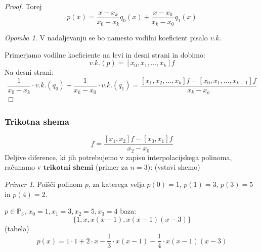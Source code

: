 \documentclass[a4paper,12pt]{article}
\theoremstyle{definition}
\theoremstyle{remark}
\newtheorem*{ex}{Primer}
\newtheorem*{rem}{Opomba}
\newcommand{\Pp}{\mathbb{P}}
\begin{document}
\begin{proof}
    Torej
    \begin{equation*}
        p(x) = \frac{x-x_k}{x_0-x_k} q_0(x) + \frac{x-x_0}{x_k-x_0} q_1(x)
    \end{equation*}
    \begin{rem}
        V nadaljevanju se bo namesto vodilni koeficient pisalo $v.k.$
    \end{rem}
    Primerjamo vodilne koeficiente na levi in desni strani in dobimo:
    \begin{equation*}
        v.k.(p) = [x_0, x_1, \dots, x_k]f
    \end{equation*}
    Na desni strani:
    \begin{equation*}
        \frac{1}{x_0-x_k} \cdot v.k. (q_0) + \frac{1}{x_k - x_0} \cdot v.k. (q_1) = \frac{[x_1, x_2, ..., x_k] f - [x_0, x_1, ..., x_{k-1}] f}{x_k - x_o}
    \end{equation*}
\end{proof}

\subsubsection*{Trikotna shema}
\begin{equation*}
    [x_0, x_1, x_2] f = \frac{[x_1, x_2]f - [x_0, x_1] f}{x_2 - x_0}
\end{equation*}
Deljive diference, ki jih potrebujemo v zapisu interpolacijskega polinoma, računamo v $\textbf{trikotni shemi}$ (primer za $n = 3$):
(vstavi shemo)


\begin{ex}
    Poišči polinom $p$, za katerega velja $p(0) = 1$, $p(1) = 3$, $p(3) = 5$ in $p(4) = 2$.

    $p \in \Pp_3$, $x_0 = 1, x_1 =3,  x_2 = 5, x_3 = 4$
    baza:
    \begin{equation*}
        \{1, x, x(x-1), x(x-1)(x-3)\}
    \end{equation*}
    (tabela)
    \begin{equation*}
        p(x) = 1 \cdot 1 + 2 \cdot x - \frac{1}{3} \cdot x(x-1) - \frac{1}{4} \cdot x(x-1)(x-3)
    \end{equation*}
\end{ex}
\end{document}
